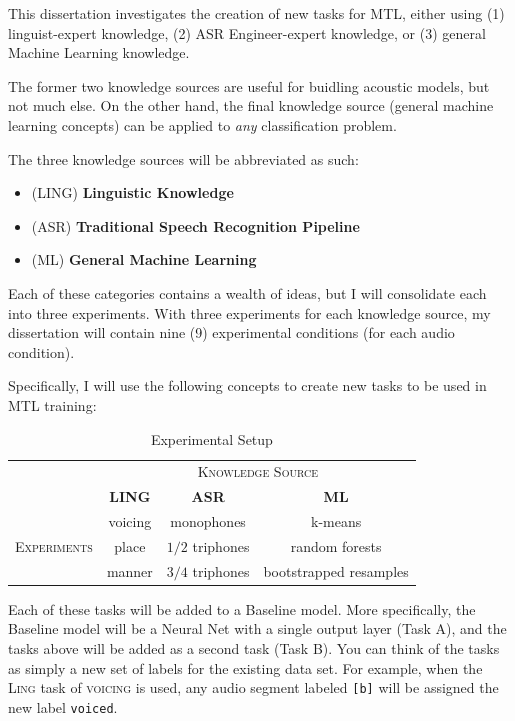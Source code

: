 \documentclass[10pt,a4paper]{article}
\begin{document}
This dissertation investigates the creation of new tasks for MTL, either using (1) linguist-expert knowledge, (2) ASR Engineer-expert knowledge, or (3) general Machine Learning knowledge.

The former two knowledge sources are useful for buidling acoustic models, but not much else. On the other hand, the final knowledge source (general machine learning concepts) can be applied to \textit{any} classification problem.

The three knowledge sources will be abbreviated as such:
  
\begin{itemize}
\item  (\textsc{LING}) \textbf{Linguistic Knowledge} 
\item (\textsc{ASR}) \textbf{Traditional Speech Recognition Pipeline}
\item (\textsc{ML}) \textbf{General Machine Learning}
\end{itemize}


Each of these categories contains a wealth of ideas, but I will consolidate each into three experiments. With three experiments for each knowledge source, my dissertation will contain nine (9) experimental conditions (for each audio condition).

Specifically, I will use the following concepts to create new tasks to be used in MTL training:

\begin{table}[!htbp]
  \centering
  \begin{adjustbox}{width=.55\textwidth}
    \begin{tabular}{cccc}
      \toprule
      & \multicolumn{3}{c}{\textsc{Knowledge Source}}\\
      & \textbf{LING} & \textbf{ASR} & \textbf{ML}\\
      \midrule
      \multirow{3}{*}{\textsc{Experiments}} & voicing & monophones &  k-means \\
      & place & $1/2$ triphones & random forests  \\
      & manner & $3/4$ triphones &  bootstrapped resamples  \\
      \bottomrule
    \end{tabular}
    \label{table:data}
  \end{adjustbox}
  
  \caption{Experimental Setup}
  
\end{table}


Each of these tasks will be added to a Baseline model. More specifically, the Baseline model will be a Neural Net with a single output layer (Task A), and the tasks above will be added as a second task (Task B). You can think of the tasks as simply a new set of labels for the existing data set. For example, when the \textsc{Ling} task of \textsc{voicing} is used, any audio segment labeled \texttt{[b]} will be assigned the new label \texttt{voiced}.
\end{document}
